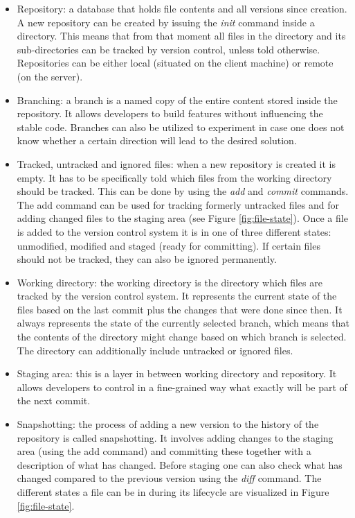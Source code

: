 \begin{itemize}
  \item Repository: a database that holds file contents and all versions since creation. A new repository can be created by issuing the \textit{init} command inside a directory. This means that from that moment all files in the directory and its sub-directories can be tracked by version control, unless told otherwise. Repositories can be either local (situated on the client machine) or remote (on the server).
  \item Branching: a branch is a named copy of the entire content stored inside the repository. It allows developers to build features without influencing the stable code. Branches can also be utilized to experiment in case one does not know whether a certain direction will lead to the desired solution.
  \item Tracked, untracked and ignored files: when a new repository is created it is empty. It has to be specifically told which files from the working directory should be tracked. This can be done by using the \textit{add} and \textit{commit} commands. The add command can be used for tracking formerly untracked files and for adding changed files to the staging area (see Figure \ref{fig:file-state}). Once a file is added to the version control system it is in one of three different states: unmodified, modified and staged (ready for committing). If certain files should not be tracked, they can also be ignored permanently.
  \item Working directory: the working directory is the directory which files are tracked  by the version control system. It represents the current state of the files based on the last commit plus the changes that were done since then. It always represents the state of the currently selected branch, which means that the contents of the directory might change based on which branch is selected. The directory can additionally include untracked or ignored files.
  \item Staging area: this is a layer in between working directory and repository. It allows developers to control in a fine-grained way what exactly will be part of the next commit.
  \item Snapshotting: the process of adding a new version to the history of the repository is called snapshotting. It involves adding changes to the staging area (using the add command) and committing these together with a description of what has changed.  Before staging one can also check what has changed compared to the previous version using the \textit{diff} command. The different states a file can be in during its lifecycle are visualized in Figure \ref{fig:file-state}.

\end{itemize}

